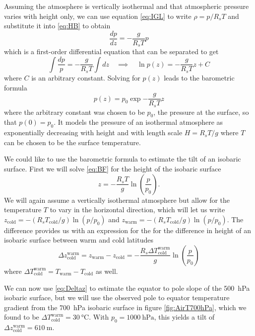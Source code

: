 \documentclass[11pt]{article}
\begin{document}

Assuming the atmosphere is vertically isothermal and that atmospheric pressure varies with height only, we can use equation \eqref{eq:IGL} to write $\rho = p/R_sT$ and substitute it into \eqref{eq:HB} to obtain
\begin{equation*}
  \frac{dp}{dz} = - \frac{g}{R_sT}p
\end{equation*}
which is a first-order differential equation that can be separated to get
\begin{equation*}
\int \frac{dp}{p} = - \frac{g}{R_sT} \int dz \quad \implies \quad \ln p(z) = - \frac{g}{R_sT}z + C
\end{equation*}
where $C$ is an arbitrary constant. Solving for $p(z)$ leads to the barometric formula
\begin{equation} \label{eq:BF}
  p(z) = p_0 \exp{-\frac{g}{R_sT}z}
\end{equation}
where the arbitrary constant was chosen to be $p_0$, the pressure at the surface, so that $p(0) = p_0$. It models the pressure of an isothermal atmosphere as exponentially decreasing with height and with length scale $H = R_sT/g$ where $T$ can be chosen to be the surface temperature.

We could like to use the barometric formula to estimate the tilt of an isobaric surface. First we will solve \eqref{eq:BF} for the height of the isobaric surface
\begin{equation}
  z = - \frac{R_sT}{g} \ln \left( \frac{p}{p_0} \right).
\end{equation}
We will again assume a vertically isothermal atmosphere but allow for the temperature $T$ to vary in the horizontal direction, which will let us write $z_\mathrm{cold} = -(R_sT_\mathrm{cold}/g)\ln(p/p_0)$ and $z_\mathrm{warm} = -(R_sT_\mathrm{cold}/g)\ln(p/p_0)$. The difference provides us with an expression for the for the difference in height of an isobaric surface between warm and cold latitudes
\begin{equation} \label{eq:Deltaz}
  \Delta z_\mathrm{cold}^\mathrm{warm} = z_\mathrm{warm} - z_\mathrm{cold} = -\frac{R_s \Delta T_\mathrm{cold}^\mathrm{warm}}{g} \ln \left( \frac{p}{p_0} \right)
\end{equation}
where $\Delta T_\mathrm{cold}^\mathrm{warm} = T_\mathrm{warm} - T_\mathrm{cold}$ as well.

We can now use \eqref{eq:Deltaz} to estimate the equator to pole slope of the \SI{500}{\hecto\Pa} isobaric surface, but we will use the observed pole to equator temperature gradient from the \SI{700}{\hecto\Pa} isobaric surface in figure \ref{fig:AirT700hPa}, which we found to be $\Delta T_\mathrm{cold}^\mathrm{warm} = \SI{30}{\degreeCelsius}$. With $p_0 = \SI{1000}{\hecto\Pa}$, this yields a tilt of $\Delta z_\mathrm{cold}^\mathrm{warm} = \SI{610}{\m}$.
\end{document}
